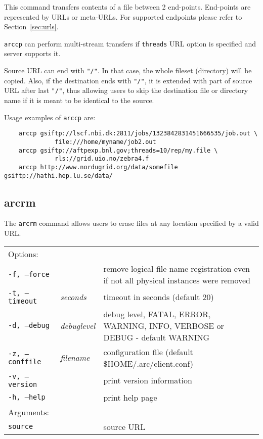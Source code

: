 This command transfers contents of a file between 2 end-points.
End-points are represented by URLs or meta-URLs. For supported
endpoints please refer to Section~\ref{sec:urls}.

\texttt{arccp} can perform multi-stream transfers if \texttt{threads}
URL option is specified and server supports it.

Source URL can end with \verb#"/"#. In that case, the whole fileset
(directory) will be copied. Also, if the destination ends with
\verb#"/"#, it is extended with part of source URL after last
\verb#"/"#, thus allowing users to skip the destination file or
directory name if it is meant to be identical to the source.

Usage examples of \texttt{arccp} are:

\begin{verbatim}
    arccp gsiftp://lscf.nbi.dk:2811/jobs/1323842831451666535/job.out \
              file:///home/myname/job2.out
    arccp gsiftp://aftpexp.bnl.gov;threads=10/rep/my.file \
              rls://grid.uio.no/zebra4.f
    arccp http://www.nordugrid.org/data/somefile gsiftp://hathi.hep.lu.se/data/
\end{verbatim}

\subsection{arcrm}\label{sec:arcrm}

The \texttt{arcrm}
command allows users to erase files at any location specified by a
valid URL.
\hspace*{0.5cm}
\begin{shaded}
\end{shaded}
\begin{longtable}{llp{8cm}}
    Options:&&\\
   \texttt{-f, --force} & &remove logical file name registration even if not all physical instances were removed\\
   \texttt{-t, --timeout}&\textit{seconds}&timeout in seconds (default 20)\\
   \texttt{-d, --debug}&\textit{debuglevel}&debug level, FATAL, ERROR, WARNING, INFO, VERBOSE or DEBUG - default WARNING\\
   \texttt{-z, --conffile}&\textit{filename}& configuration file (default {\$}HOME/.arc/client.conf)\\
   \texttt{-v, --version}&&print version information\\
   \texttt{-h, --help}&&print help page\\
    Arguments:&&\\
   \texttt{source} && source URL\\
\end{longtable}

